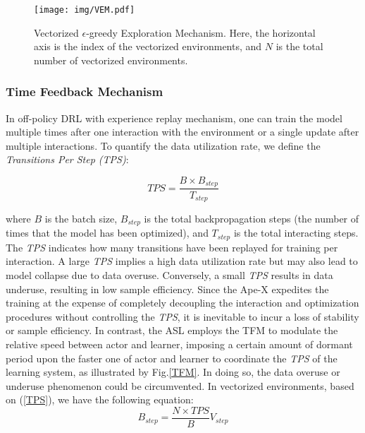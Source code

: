 \documentclass[journal]{IEEEtran}
\begin{document}
\begin{figure}[t]
	\centering
	\texttt{[image: img/VEM.pdf]}
	\caption{Vectorized $\epsilon$-greedy Exploration Mechanism. Here, the horizontal axis is the index of the vectorized environments, and $N$ is the total number of vectorized environments.}
	\label{VEM}
\end{figure}

\subsubsection{Time Feedback Mechanism}

In off-policy DRL with experience replay mechanism, one can train the model multiple times after one interaction with the environment or a single update after multiple interactions. To quantify the data utilization rate, we define the \textit{Transitions Per Step (TPS)}:

\begin{equation}
	\label{TPS}
	TPS = \frac{B \times B_{step}}{T_{step}}
\end{equation}

\noindent where $B$ is the batch size, $B_{step}$ is the total backpropagation steps (the number of times that the model has been optimized), and $T_{step}$ is the total interacting steps. The \textit{TPS} indicates how many transitions have been replayed for training per interaction. A large \textit{TPS} implies a high data utilization rate but may also lead to model collapse due to data overuse\cite{overuse}. Conversely, a small \textit{TPS} results in data underuse, resulting in low sample efficiency. Since the Ape-X expedites the training at the expense of completely decoupling the interaction and optimization procedures without controlling the \textit{TPS}, it is inevitable to incur a loss of stability or sample efficiency. In contrast, the ASL employs the TFM to modulate the relative speed between actor and learner, imposing a certain amount of dormant period upon the faster one of actor and learner to coordinate the \textit{TPS} of the learning system, as illustrated by Fig.\ref{TFM}. In doing so, the data overuse or underuse phenomenon could be circumvented. In vectorized environments, based on (\ref{TPS}), we have the following equation:
\begin{equation}
	\label{V2B}
	B_{step} = \frac{N \times TPS}{B} V_{step}
\end{equation}
\end{document}
